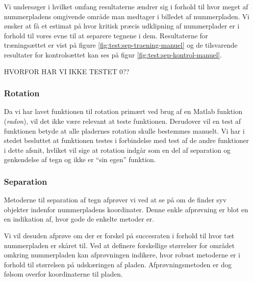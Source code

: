 Vi undersøger i hvilket omfang resultaterne ændrer sig i forhold til hvor meget af nummerpladens omgivende område man medtager i billedet af nummerpladen. Vi ønsker at få et estimat på hvor kritisk præcis udklipning af nummerplader er i forhold til vores evne til at separere tegnene i dem. Resultaterne for træningsættet er vist på figure \vref{fig:test:sep-traening-manuel} og de tilsvarende resultater for kontrolsættet kan ses på figur \ref{fig:test:sep-kontrol-manuel}.

HVORFOR HAR VI IKKE TESTET 0??

\subsubsection*{Rotation}

Da vi har lavet funktionen til rotation primært ved brug af en Matlab funktion (\textit{radon}), vil det ikke være relevant at teste funktionen. Derudover vil en test af funktionen betyde at alle pladernes rotation skulle bestemmes manuelt. Vi har i stedet besluttet at funktionen testes i forbindelse med test af de andre funktioner i dette afsnit, hvliket vil sige at rotation indgår som en del af separation og genkendelse af tegn og ikke er ``sin egen'' funktion.

\subsubsection*{Separation}
Metoderne til separation af tegn afprøver vi ved at se på om de finder syv objekter indenfor nummerpladens koordinater. Denne enkle afprøvning er blot en en indikation af, hvor gode de enkelte metoder er.

Vi vil desuden afprøve om der er forskel på succesraten i forhold til hvor tæt nummerpladen er skåret til. Ved at definere forskellige størrelser for området omkring nummerpladen kan afprøvningen indikere, hvor robust metoderne er i forhold til størrelsen på udskæringen af pladen. Afprøvningsmetoden er dog følsom overfor koordinaterne til pladen.


